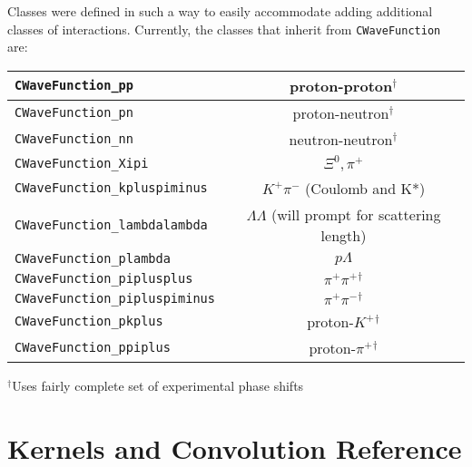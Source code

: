 \documentclass[10pt]{article}
\begin{document}
Classes were defined in such a way to easily accommodate adding additional classes of interactions. Currently, the classes that inherit from {\tt CWaveFunction} are:
\begin{center}
\begin{tabular}{|l|c|}\hline
{\tt CWaveFunction\_pp} & proton-proton$^\dagger$\\ \hline
{\tt CWaveFunction\_pn} & proton-neutron$^\dagger$\\ \hline
{\tt CWaveFunction\_nn} & neutron-neutron$^\dagger$\\ \hline
{\tt CWaveFunction\_Xipi} & $\Xi^0,\pi^+$\\ \hline
{\tt CWaveFunction\_kpluspiminus} & $K^+\pi^-$ (Coulomb and K*)\\ \hline
{\tt CWaveFunction\_lambdalambda} & $\Lambda\Lambda$ 
(will prompt for scattering length)\\ \hline
{\tt CWaveFunction\_plambda} & $p\Lambda$ \\ \hline
{\tt CWaveFunction\_piplusplus} & $\pi^+\pi^+$$^\dagger$\\ \hline
{\tt CWaveFunction\_pipluspiminus} & $\pi^+\pi^-$$^\dagger$\\ \hline
{\tt CWaveFunction\_pkplus} & proton-$K^+$$^\dagger$\\ \hline
{\tt CWaveFunction\_ppiplus} & proton-$\pi^+$$^\dagger$\\ \hline
\end{tabular}
\end{center}
$^\dagger${\small Uses fairly complete set of experimental phase shifts}

\section{Kernels and Convolution Reference}
\end{document}
